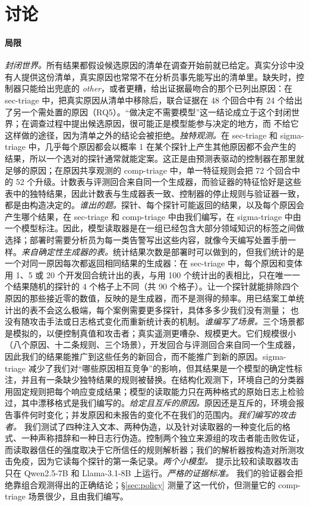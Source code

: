\section{讨论}
\label{sec:discussion}

\paragraph{局限} \emph{封闭世界。}所有结果都假设候选原因的清单在调查开始前就已给定。真实分诊中没有人提供这份清单，真实原因也常常不在分析员事先能写出的清单里。缺失时，控制器只能给出兜底的 \textit{other}，或者更糟，给出证据最吻合的那个已列出原因：在 sec-triage 中，把真实原因从清单中移除后，联合证据在 48 个回合中有 24 个给出了另一个需处置的原因（RQ5）。“做决定不需要模型”这一结论成立于这个封闭世界；在调查过程中提出候选原因，很可能正是模型能参与决定的地方，而 \hesp{} 不给它这样做的途径，因为清单之外的结论会被拒绝。\emph{独特观测。}在 sec-triage 和 sigma-triage 中，几乎每个原因都会以概率 1 在某个探针上产生其他原因都不会产生的结果，所以一个选对的探针通常就能定案。这正是由预测表驱动的控制器在那里就足够的原因；在原因共享观测的 comp-triage 中，单一特征规则会把 72 个回合中的 52 个升级。计数表与评测回合来自同一个生成器，而验证器的特征恰好是这些表中的独特结果，因此计数表与生成器表一致、控制器的停止规则与验证器一致，都是由构造决定的。\emph{谁出的题。}探针、每个探针可能返回的结果，以及每个原因会产生哪个结果，在 sec-triage 和 comp-triage 中由我们编写，在 sigma-triage 中由一个模型标注。因此，模型读取器是在一组已经包含大部分领域知识的标签之间做选择；部署时需要分析员为每一类告警写出这些内容，就像今天编写处置手册一样。\emph{来自确定性生成器的表。}统计结果次数是部署时可以做到的，但我们统计的是一个对同一原因每次都返回相同结果的生成器：在 sec-triage 中，每个原因和变体用 1、5 或 20 个开发回合统计出的表，与用 100 个统计出的表相比，只在唯一一个结果随机的探针的 4 个格子上不同（共 90 个格子）。让一个探针就能排除四个原因的那些接近零的数值，反映的是生成器，而不是测得的频率。用已结案工单统计出的表不会这么极端，每个案例需要更多探针，具体多多少我们没有测量；\hesp{} 也没有随攻击手法或日志格式变化而重新统计表的机制。\emph{谁编写了场景。}三个场景都是模拟的，以便控制真值和攻击者；真实遥测更嘈杂、规模更大。它们规模很小（八个原因、十二条规则、三个场景），开发回合与评测回合来自同一个生成器，因此我们的结果能推广到这些任务的新回合，而不能推广到新的原因。sigma-triage 减少了我们对“哪些原因相互竞争”的影响，但其结果是一个模型的确定性标注，并且有一条缺少独特结果的规则被替换。在结构化观测下，环境自己的分类器用固定规则把每个响应变成结果；模型的读取能力只在两种格式的原始日志上检验过，其中漂移格式是我们编写的。\emph{给定且互斥的原因。}原因还是互斥的，环境会报告事件何时变化；并发原因和未报告的变化不在我们的范围内。\emph{我们编写的攻击者。} 我们测试了四种注入文本、两种伪造，以及针对读取器的一种变化后的格式、一种声称措辞和一种日志行伪造。控制两个独立来源组的攻击者能击败佐证，而读取器信任的强度取决于它所信任的规则解析器；我们的解析器按构造对所测攻击免疫，因为它读每个探针的第一条记录。\emph{两个小模型。} 提示比较和读取器攻击只在 Qwen2.5-7B 和 Llama-3.1-8B 上运行。\emph{严格的证据标准。} 我们的验证器会拒绝靠组合观测得出的正确结论；\S\ref{sec:policy} 测量了这一代价，但测量它的 comp-triage 场景很少，且由我们编写。

